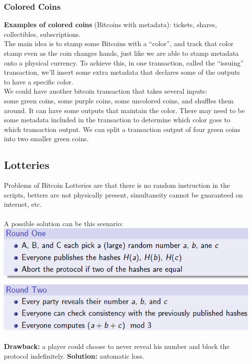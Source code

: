 \documentclass{article}
\begin{document}
\subsubsection{Colored Coins}
\textbf{Examples of colored coins }(Bitcoins with metadata): tickets, shares, collectibles, subscriptions.\\
The main idea is to stamp some Bitcoins with a “color”, and track that color stamp even as the coin changes hands, just like we are able to stamp metadata onto a physical currency. To achieve this, in one transaction, called the “issuing” transaction, we’ll insert some extra metadata that declares some of the outputs to have a specific color. \\
We could have another bitcoin transaction that takes several inputs:\\
some green coins, some purple coins, some uncolored coins, and shuffles them around. It can have some outputs that maintain the color. There may need to be some metadata included in the transaction to determine which color goes to which transaction output. We can split a transaction output of four green coins into two smaller green coins.


\subsection{Lotteries}
Problems of Bitcoin Lotteries are that there is no random instruction in the scripts, betters are not physically present, simultaneity cannot be guaranteed on internet, etc.\\\\
A possible solution can be this scenario:\\
\includegraphics[scale=0.7]{49.png}\\\\
\textbf{Drawback:} a player could choose to never reveal his number and block the protocol indefinitely. \textbf{Solution:} automatic loss.
\end{document}
